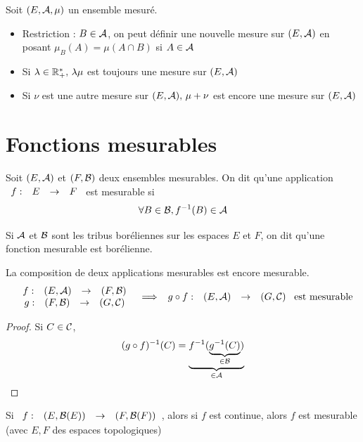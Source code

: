 \documentclass[]{report}
\begin{document}
\begin{prop}
    Soit $(E,\mathcal{A},\mu)$ un ensemble mesuré.
    \begin{itemize}
        \item Restriction : $B\in\mathcal{A}$, on peut définir une nouvelle mesure sur $(E,\mathcal{A})$ en posant $\mu_B(A)=\mu(A\cap B)$ si $A\in\mathcal{A}$
        \item Si $\lambda\in \mathbb{R}_+^*,\,\lambda\mu$ est toujours une mesure sur $(E,\mathcal{A})$
        \item Si $\nu$ est une autre mesure sur $(E,\mathcal{A}),\,\mu+\nu$ est encore une mesure sur $(E,\mathcal{A})$
    \end{itemize}
\end{prop}

\section{Fonctions mesurables}

\begin{df}
    Soit $(E,\mathcal{A})$ et $(F,\mathcal{B})$ deux ensembles mesurables. On dit qu'une application $\begin{array}{ccccc} f : & E & \to & F \end{array}$ est mesurable si $$\forall B\in\mathcal{B},f^{-1}(B)\in\mathcal{A}$$
\end{df}

\begin{ex}
    Si $\mathcal{A}$ et $\mathcal{B}$ sont les tribus boréliennes sur les espaces $E$ et $F$, on dit qu'une fonction mesurable est borélienne.
\end{ex}

\begin{prop}
    La composition de deux applications mesurables est encore mesurable. $$\begin{array}{cc}
    \begin{array}{ccccc} f : & (E,\mathcal{A}) & \to & (F,\mathcal{B}) \end{array} \\
    \begin{array}{ccccc} g : & (F,\mathcal{B}) & \to & (G,\mathcal{C}) \end{array}
    \end{array}\implies \begin{array}{ccccc} g\circ f : & (E,\mathcal{A}) & \to & (G,\mathcal{C}) \end{array} \text{ est mesurable}$$
\end{prop}

\begin{proof}
    Si $C\in\mathcal{C}$,$$(g\circ f)^{-1}(C)=\underbrace{f^{-1}(\underbrace{g^{-1}(C)}_{\in\mathcal{B}})}_{\in\mathcal{A}}$$
\end{proof}

\begin{prop}
    Si $\begin{array}{ccccc} f : & (E,\mathcal{B}(E)) & \to & (F,\mathcal{B}(F)) \end{array}$, alors si $f$ est continue, alors $f$ est mesurable (avec $E,F$ des espaces topologiques)
\end{prop}
\end{document}
